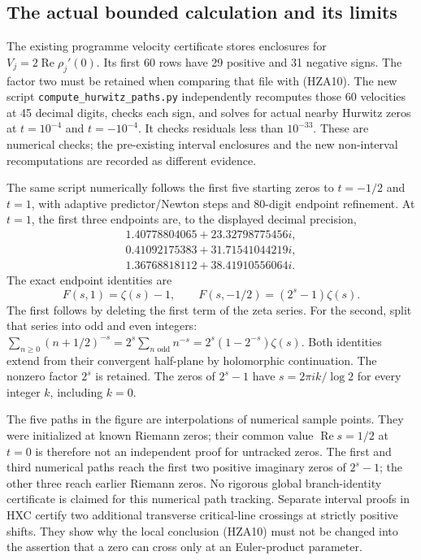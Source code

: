 \subsection{The actual bounded calculation and its limits}

The existing programme velocity certificate stores enclosures for
$V_j=2\operatorname{Re}\rho_j'(0)$. Its first 60 rows have 29
positive and 31 negative signs. The factor two must be retained when
comparing that file with (HZA10). The new script
\texttt{compute\_\allowbreak hurwitz\_\allowbreak paths.py} independently recomputes those
60 velocities at 45 decimal digits, checks each sign, and solves
for actual nearby Hurwitz zeros at $t=10^{-4}$ and $t=-10^{-4}$.
It checks residuals less than $10^{-33}$. These are numerical checks;
the pre-existing interval enclosures and the new non-interval
recomputations are recorded as different evidence.

The same script numerically follows the first five starting zeros
to $t=-1/2$ and $t=1$, with adaptive predictor/Newton steps and
80-digit endpoint refinement. At $t=1$, the first three endpoints
are, to the displayed decimal precision,
\[
\begin{gathered}
 1.40778804065+23.32798775456i,\\
 0.41092175383+31.71541044219i,\\
 1.36768818112+38.41910556064i.
\end{gathered}
\]
The exact endpoint identities are
\begin{equation}\tag{HZA13}
 F(s,1)=\zeta(s)-1,\qquad
 F(s,-1/2)=(2^s-1)\zeta(s).
\end{equation}
The first follows by deleting the first term of the zeta series.
For the second, split that series into odd and even integers:
$\sum_{n\ge0}(n+1/2)^{-s}=2^s\sum_{n\text{ odd}}n^{-s}
=2^s(1-2^{-s})\zeta(s)$. Both identities extend from their
convergent half-plane by holomorphic continuation. The nonzero
factor $2^s$ is retained. The zeros of $2^s-1$ have
$s=2\pi i k/\log2$ for every integer $k$, including $k=0$.

The five paths in the figure are interpolations of numerical sample
points. They were initialized at known Riemann zeros; their common
value $\operatorname{Re}s=1/2$ at $t=0$ is therefore not an
independent proof for untracked zeros. The first and third numerical
paths reach the first two positive imaginary zeros of $2^s-1$;
the other three reach earlier Riemann zeros. No rigorous global
branch-identity certificate is claimed for this numerical path
tracking. Separate interval proofs in HXC certify two additional
transverse critical-line crossings at strictly positive shifts.
They show why the local conclusion (HZA10) must not be changed into
the assertion that a zero can cross only at an Euler-product parameter.
